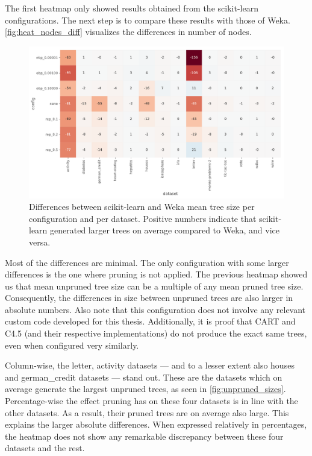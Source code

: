 The first heatmap only showed results obtained from the scikit-learn configurations. The next step is to compare these results with those of Weka. \autoref{fig:heat_nodes_diff} visualizes the differences in number of nodes.

\begin{figure}[htp]
    \includegraphics[width=\textwidth]{img/heatmap_n_nodes_diff.pdf}
    \caption{Differences between scikit-learn and Weka mean tree size per configuration and per dataset. Positive numbers indicate that scikit-learn generated larger trees on average compared to Weka, and vice versa.}%
    \label{fig:heat_nodes_diff}
\end{figure}

Most of the differences are minimal. The only configuration with some larger differences is the one where pruning is not applied. The previous heatmap showed us that mean unpruned tree size can be a multiple of any mean pruned tree size. Consequently, the differences in size between unpruned trees are also larger in absolute numbers. Also note that this configuration does not involve any relevant custom code developed for this thesis. Additionally, it is proof that CART and C4.5 (and their respective implementations) do not produce the exact same trees, even when configured very similarly.

Column-wise, the letter, activity datasets --- and to a lesser extent also houses and german\_credit datasets --- stand out. These are the datasets which on average generate the largest unpruned trees, as seen in \autoref{fig:unpruned_sizes}. Percentage-wise the effect pruning has on these four datasets is in line with the other datasets. As a result, their pruned trees are on average also large. This explains the larger absolute differences. When expressed relatively in percentages, the heatmap does not show any remarkable discrepancy between these four datasets and the rest.

